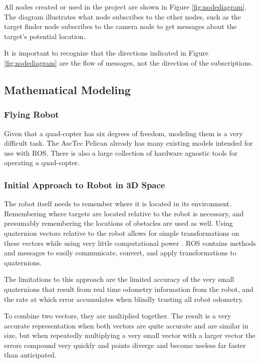 \documentclass{article}[12]
\begin{document}
	All nodes created or used in the project are shown in Figure \ref{fig:nodediagram}. The diagram illustrates what node subscribes to the other nodes, such as the target finder node subscribes to the camera node to get messages about the target's potential location. 
	
 	It is important to recognize that the directions indicated in Figure \ref{fig:nodediagram} are the flow of messages, not the direction of the subscriptions. 

	\subsection{Mathematical Modeling}
	
		\subsubsection{Flying Robot}
	
		Given that a quad-copter has six degrees of freedom, modeling them is a very difficult task. The AscTec Pelican already has many existing models intended for use with ROS. There is also a large collection of hardware agnostic tools for operating a quad-copter.
	
		\subsubsection{Initial Approach to Robot in 3D Space}
		
		The robot itself needs to remember where it is located in its environment. Remembering where targets are located relative to the robot is necessary, and presumably remembering the locations of obstacles are used as well. Using quaternion vectors relative to the robot allows for simple transformations on these vectors while using very little computational power \cite{williams2010combining}. ROS contains methods and messages to easily communicate, convert, and apply transformations to quaternions.
		
		The limitations to this approach are the limited accuracy of the very small quaternions that result from real time odometry information from the robot, and the rate at which error accumulates when blindly trusting all robot odometry. 
		
		To combine two vectors, they are multiplied together. The result is a very accurate representation when both vectors are quite accurate and are similar in size, but when repeatedly multiplying a very small vector with a larger vector the errors compound very quickly and points diverge and become useless far faster than anticipated.
	
\end{document}
